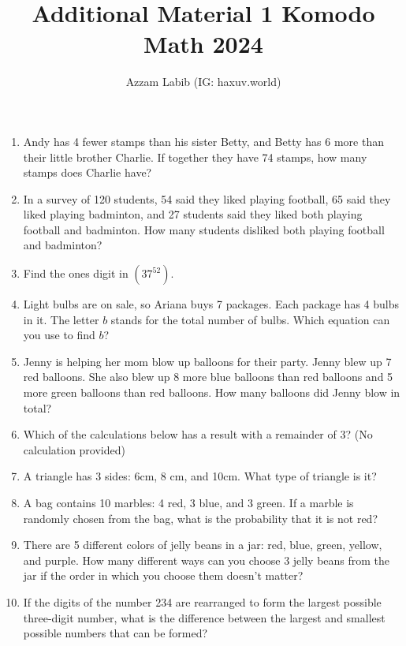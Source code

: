 \documentclass[11pt]{scrartcl}
\title{Additional Material 1 Komodo Math 2024}
\author{Azzam Labib (IG: haxuv.world)}
\begin{document}
\maketitle

\begin{enumerate}
\item Andy has 4 fewer stamps than his sister Betty, and Betty has 6 more than their little brother Charlie. If together they have 74 stamps, how many stamps does Charlie have?

\item In a survey of 120 students, 54 said they liked playing football, 65 said they liked playing badminton, and 27 students said they liked both playing football and badminton. How many students disliked both playing football and badminton?

\item Find the ones digit in $(37^{52})$.

\item Light bulbs are on sale, so Ariana buys 7 packages. Each package has 4 bulbs in it. The letter $b$ stands for the total number of bulbs. Which equation can you use to find $b$?

\item Jenny is helping her mom blow up balloons for their party. Jenny blew up 7 red balloons. She also blew up 8 more blue balloons than red balloons and 5 more green balloons than red balloons. How many balloons did Jenny blow in total?

\item Which of the calculations below has a result with a remainder of 3? (No calculation provided)

\item A triangle has 3 sides: 6cm, 8 cm, and 10cm. What type of triangle is it?

\item A bag contains 10 marbles: 4 red, 3 blue, and 3 green. If a marble is randomly chosen from the bag, what is the probability that it is not red?

\item There are 5 different colors of jelly beans in a jar: red, blue, green, yellow, and purple. How many different ways can you choose 3 jelly beans from the jar if the order in which you choose them doesn't matter?

\item If the digits of the number 234 are rearranged to form the largest possible three-digit number, what is the difference between the largest and smallest possible numbers that can be formed?


\end{enumerate}
\end{document}
